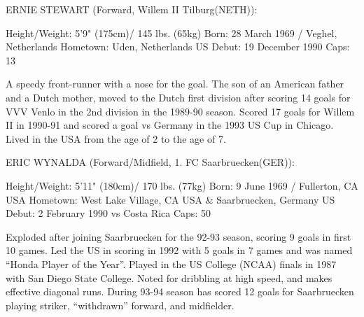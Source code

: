 ERNIE STEWART (Forward, Willem II Tilburg(NETH)):

Height/Weight: 5'9" (175cm)/ 145 lbs. (65kg)
Born: 28 March 1969 / Veghel, Netherlands
Hometown: Uden, Netherlands
US Debut: 19 December 1990
Caps: 13

A speedy front-runner with a nose for the goal. The son of an American father 
and a Dutch mother, moved to the Dutch first division after scoring 14 goals 
for VVV Venlo in the 2nd division in the 1989-90 season. Scored 17 goals for 
Willem II in 1990-91 and scored a goal vs Germany in the 1993 US Cup in 
Chicago. Lived in the USA from the age of 2 to the age of 7.


ERIC WYNALDA (Forward/Midfield, 1. FC Saarbruecken(GER)):

Height/Weight: 5'11" (180cm)/ 170 lbs. (77kg)
Born: 9 June 1969 / Fullerton, CA USA
Hometown: West Lake Village, CA USA \& Saarbruecken, Germany
US Debut: 2 February 1990 vs Costa Rica
Caps: 50

Exploded after joining Saarbruecken for the 92-93 season, scoring 9 goals in 
first 10 games. Led the US in scoring in 1992 with 5 goals in 7 games and was 
named ``Honda Player of the Year''. Played in the US College (NCAA) finals in 
1987 with San Diego State College. Noted for dribbling at high speed, and makes
effective diagonal runs. During 93-94 season has scored 12 goals for
Saarbruecken playing striker, ``withdrawn'' forward, and midfielder.
